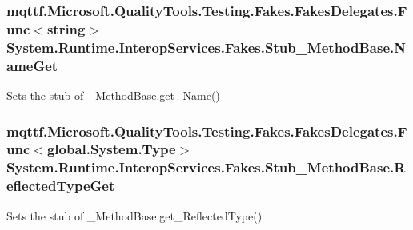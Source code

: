 \hypertarget{class_system_1_1_runtime_1_1_interop_services_1_1_fakes_1_1_stub___method_base_a274514eb4c0588060cd01f3821f6d482}{
\subsubsection[{Name\-Get}]{\setlength{\rightskip}{0pt plus 5cm}mqttf.\-Microsoft.\-Quality\-Tools.\-Testing.\-Fakes.\-Fakes\-Delegates.\-Func$<$string$>$ System.\-Runtime.\-Interop\-Services.\-Fakes.\-Stub\-\_\-\-Method\-Base.\-Name\-Get}}\label{class_system_1_1_runtime_1_1_interop_services_1_1_fakes_1_1_stub___method_base_a274514eb4c0588060cd01f3821f6d482}


Sets the stub of \-\_\-\-Method\-Base.\-get\-\_\-\-Name()

\hypertarget{class_system_1_1_runtime_1_1_interop_services_1_1_fakes_1_1_stub___method_base_a336bc16084d067154083bffea80e6123}{
\subsubsection[{Reflected\-Type\-Get}]{\setlength{\rightskip}{0pt plus 5cm}mqttf.\-Microsoft.\-Quality\-Tools.\-Testing.\-Fakes.\-Fakes\-Delegates.\-Func$<$global.\-System.\-Type$>$ System.\-Runtime.\-Interop\-Services.\-Fakes.\-Stub\-\_\-\-Method\-Base.\-Reflected\-Type\-Get}}\label{class_system_1_1_runtime_1_1_interop_services_1_1_fakes_1_1_stub___method_base_a336bc16084d067154083bffea80e6123}


Sets the stub of \-\_\-\-Method\-Base.\-get\-\_\-\-Reflected\-Type()

